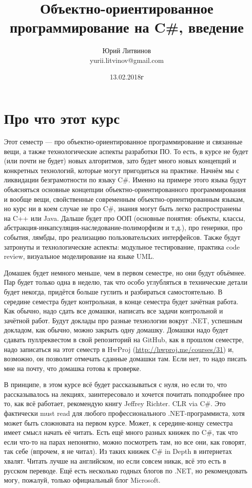 \documentclass[a5paper]{article}
\title{Объектно-ориентированное программирование на C\#, введение}
\author{Юрий Литвинов\\\small{yurii.litvinov@gmail.com}}
\date{13.02.2018г}
\begin{document}
\maketitle
\thispagestyle{empty}

\section{Про что этот курс}

Этот семестр --- про объектно-ориентированное программирование и связанные вещи, а также технологические аспекты разработки ПО. То есть, в курсе не будет (или почти не будет) новых алгоритмов, зато будет много новых концепций и конкретных технологий, которые могут пригодиться на практике. Начнём мы с ликвидации безграмотности по языку C\#. Именно на примере этого языка будут объясняться основные концепции объектно-ориентированного программирования и вообще вещи, свойственные современным объектно-ориентированным языкам, но курс ни в коем случае не про C\#, знания могут быть легко распространены на C++ или Java. Дальше будет про ООП (основные понятия: объекты, классы, абстракция-инкапсуляция-наследование-полиморфизм и т.д.), про генерики, про события, лямбды, про реализацию пользовательских интерфейсов. Также будут затронуты и технологические аспекты: модульное тестирование, практика code review, визуальное моделирование на языке UML.

Домашек будет немного меньше, чем в первом семестре, но они будут объёмнее. Пар будет только одна в неделю, так что особо углубляться в технические детали будет некогда, придётся больше гуглить и разбираться самостоятельно. В середине семестра будет контрольная, в конце семестра будет зачётная работа. Как обычно, надо сдать все домашки, написать все задачи контрольной и зачётной работ. Будут доклады про разные технологии вокруг .NET, успешным докладом, как обычно, можно закрыть одну домашку. Домашки надо будет сдавать пуллреквестом в свой репозиторий на GitHub, как в прошлом семестре, надо записаться на этот семестр в HwProj (\url{http://hwproj.me/courses/31}) и, возможно, он позволит отмечать сданные домашки там. Если нет, то надо писать мне на почту, что домашка готова к проверке.

В принципе, в этом курсе всё будет рассказываться с нуля, но если то, что рассказывалось на лекциях, заинтересовало и хочется почитать поподробнее про то, как всё работает, рекомендую книгу Jeffrey Richter. CLR via C\#. Это фактически must read для любого профессионального .NET-программиста, хотя может быть сложновата на первом курсе. Может, к середине-концу семестра имеет смысл начать её читать. Есть ещё много разных книжек по C\#, так что если что-то на парах непонятно, можно посмотреть там, но все они, как говорят, так себе (впрочем, я не читал). Из таких книжек C\# in Depth в интернетах хвалят. Читать лучше на английском, но если совсем никак, всё это есть в русском переводе. Ещё есть несколько годных блогов по .NET, но рекомендовать могу, пожалуй, только официальный блог Microsoft.
\end{document}
